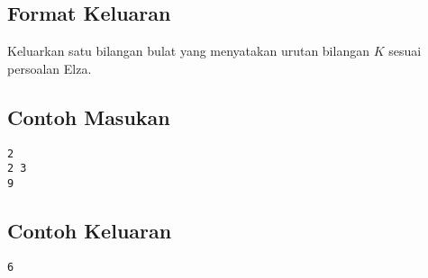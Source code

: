 \documentclass{article}
\begin{document}
\subsection*{Format Keluaran}

Keluarkan satu bilangan bulat yang menyatakan urutan bilangan $K$ sesuai persoalan Elza.
\\

\begin{multicols}{2}
\subsection*{Contoh Masukan}
\begin{lstlisting}
2
2 3
9
\end{lstlisting}
\columnbreak
\subsection*{Contoh Keluaran}
\begin{lstlisting}
6
\end{lstlisting}
\vfill
\null
\end{multicols}


\pagebreak
\end{document}
